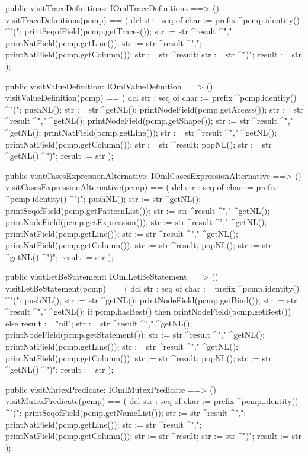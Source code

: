 \begin{vdm_al}
  public visitTraceDefinitions: IOmlTraceDefinitions ==> ()
  visitTraceDefinitions(pcmp) ==
    ( dcl str : seq of char := prefix ^pcmp.identity() ^"(";
      printSeqofField(pcmp.getTraces());
      str := str ^result ^",";
      printNatField(pcmp.getLine());
      str := str ^result ^",";
      printNatField(pcmp.getColumn());
      str := str ^result;
      str := str ^")";
      result := str );

  public visitValueDefinition: IOmlValueDefinition ==> ()
  visitValueDefinition(pcmp) ==
    ( dcl str : seq of char := prefix ^pcmp.identity() ^"(";
      pushNL();
      str := str ^getNL();
      printNodeField(pcmp.getAccess());
      str := str ^result ^"," ^getNL();
      printNodeField(pcmp.getShape());
      str := str ^result ^"," ^getNL();
      printNatField(pcmp.getLine());
      str := str ^result ^"," ^getNL();
      printNatField(pcmp.getColumn());
      str := str ^result;
      popNL();
      str := str ^getNL() ^")";
      result := str );

  public visitCasesExpressionAlternative: IOmlCasesExpressionAlternative ==> ()
  visitCasesExpressionAlternative(pcmp) ==
    ( dcl str : seq of char := prefix ^pcmp.identity() ^"(";
      pushNL();
      str := str ^getNL();
      printSeqofField(pcmp.getPatternList());
      str := str ^result ^"," ^getNL();
      printNodeField(pcmp.getExpression());
      str := str ^result ^"," ^getNL();
      printNatField(pcmp.getLine());
      str := str ^result ^"," ^getNL();
      printNatField(pcmp.getColumn());
      str := str ^result;
      popNL();
      str := str ^getNL() ^")";
      result := str );

  public visitLetBeStatement: IOmlLetBeStatement ==> ()
  visitLetBeStatement(pcmp) ==
    ( dcl str : seq of char := prefix ^pcmp.identity() ^"(";
      pushNL();
      str := str ^getNL();
      printNodeField(pcmp.getBind());
      str := str ^result ^"," ^getNL();
      if pcmp.hasBest()
      then printNodeField(pcmp.getBest())
      else result := "nil";
      str := str ^result ^"," ^getNL();
      printNodeField(pcmp.getStatement());
      str := str ^result ^"," ^getNL();
      printNatField(pcmp.getLine());
      str := str ^result ^"," ^getNL();
      printNatField(pcmp.getColumn());
      str := str ^result;
      popNL();
      str := str ^getNL() ^")";
      result := str );

  public visitMutexPredicate: IOmlMutexPredicate ==> ()
  visitMutexPredicate(pcmp) ==
    ( dcl str : seq of char := prefix ^pcmp.identity() ^"(";
      printSeqofField(pcmp.getNameList());
      str := str ^result ^",";
      printNatField(pcmp.getLine());
      str := str ^result ^",";
      printNatField(pcmp.getColumn());
      str := str ^result;
      str := str ^")";
      result := str );


\end{vdm_al}
